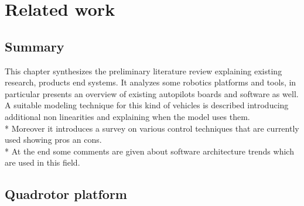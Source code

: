 

\chapter{Related work}
\label{chap:second
}
\ifpdf
    \graphicspath{{Chapter2/Figures/PNG/}{Chapter2/Figures/PDF/}{Chapter2/Figures/}}
\else
    \graphicspath{{Chapter2/Figures/EPS/}{Chapter2/Figures/}}
\fi

\section*{Summary}
This chapter synthesizes the preliminary literature review explaining existing research, products end systems. It analyzes some robotics platforms and tools, in particular presents an overview of existing autopilots boards and software as well. A suitable modeling technique for this kind of vehicles is described introducing additional non linearities and explaining when the model uses them.\\*
Moreover it introduces a survey on various control techniques that are currently used showing pros an cons. \\*
At the end some comments are given about software architecture trends which are used in this field. 

\section{Quadrotor platform}

